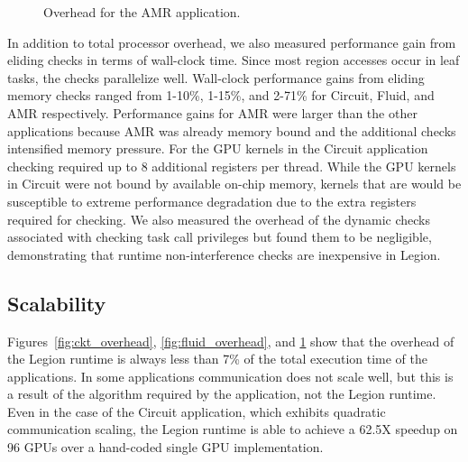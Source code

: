 \begin{figure}
\begin{center}
{\label{fig:amr16384}
}
\end{center}
\vspace{-2mm}
\caption{Overhead for the AMR application.\label{fig:amr_overhead}}
\vspace{-8mm}
\end{figure}

In addition to total processor overhead, we also measured performance gain from eliding checks in 
terms of wall-clock time.  Since most region accesses occur in leaf tasks, the checks parallelize 
well.  Wall-clock performance gains from eliding memory checks ranged from 1-10\%, 1-15\%, 
and 2-71\% for Circuit, Fluid, and AMR respectively.  Performance gains for AMR were larger than
the other applications because AMR was already memory bound and the additional checks intensified
memory pressure.  For the GPU kernels in the Circuit application checking required up to 8 additional 
registers per thread.  While the GPU kernels in Circuit were not bound by 
available on-chip memory, kernels that are would be susceptible to extreme performance 
degradation due to the extra registers required for checking.  We also measured the overhead
of the dynamic checks associated with checking task call privileges but found them to be negligible,
demonstrating that runtime non-interference checks are inexpensive in Legion.

\subsection{Scalability}
\label{subsec:scalability}

Figures~\ref{fig:ckt_overhead}, \ref{fig:fluid_overhead}, and \ref{fig:amr_overhead} show that
the overhead of the Legion runtime is always less than 7\% of the total execution time
of the applications.  In some applications communication does not scale well, but this is
a result of the algorithm required by the application, not the Legion runtime.
Even in the case of the Circuit application, which exhibits quadratic communication scaling, the Legion
runtime is able to achieve a 62.5X speedup on 96 GPUs over a hand-coded single GPU implementation\cite{Legion12}.

